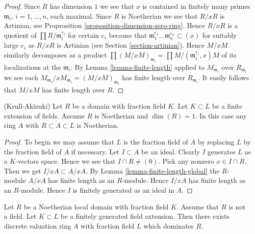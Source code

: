 \begin{proof}
Since $R$ has dimension $1$ we see that
$x$ is contained in finitely many primes
$\mathfrak m_i$, $i = 1, \ldots, n$, each maximal.
Since $R$ is Noetherian we see that $R/xR$ is Artinian,
see Proprosition \ref{proposition-dimension-zero-ring}.
Hence $R/xR$ is a quotient of
$\prod R/\mathfrak m_i^{e_i}$ for certain $e_i$ because
that $\mathfrak m_1^{e_1} \ldots \mathfrak m_n^{e_n} \subset (x)$
for suitably large $e_i$ as $R/xR$ is Artinian
(see Section \ref{section-artinian}).
Hence $M/xM$ similarly decomposes as a product
$\prod (M/xM)_{\mathfrak m_i} = \prod M/(\mathfrak m_i^{e_i}, x)M$
of its localizations at the $\mathfrak m_i$. By
Lemma \ref{lemma-finite-length} applied to $M_{\mathfrak m_i}$
over $R_{\mathfrak m_i}$ we see each
$M_{\mathfrak m_i}/xM_{\mathfrak m_i} = (M/xM)_{\mathfrak m_i}$
has finite length over $R_{\mathfrak m_i}$. It easily follows that $M/xM$
has finite length over $R$.
\end{proof}

\begin{lemma}
\label{lemma-krull-akizuki}
(Krull-Akizuki)
Let $R$ be a domain with fraction field $K$.
Let $K \subset L$ be a finite extension of fields.
Assume $R$ is Noetherian and $\dim(R) = 1$.
In this case any ring $A$ with $R \subset A \subset L$ is
Noetherian.
\end{lemma}

\begin{proof}
To begin we may assume that $L$ is the fraction field of $A$
by replacing $L$ by the fraction field of $A$ if necessary.
Let $I \subset A$ be an ideal. Clearly $I$ generates $L$ as
a $K$-vectors space. Hence we see that $I \cap R \not = (0)$.
Pick any nonzero $x \in I \cap R$. Then we get
$I/xA \subset A/xA$. By Lemma \ref{lemma-finite-length-global}
the $R$-module $A/xA$ has finite length as an $R$-module. Hence
$I/xA$ has finite length as an $R$-module. Hence $I$ is finitely
generated as an ideal in $A$.
\end{proof}

\begin{lemma}
\label{lemma-exists-dvr}
Let $R$ be a Noetherian local domain with fraction field $K$.
Assume that $R$ is not a field.
Let $K \subset L$ be a finitely generated field extension.
Then there exists discrete valuation ring $A$ with fraction field
$L$ which dominates $R$.
\end{lemma}


